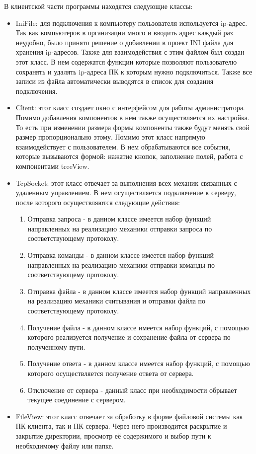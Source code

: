 В клиентской части программы находятся следующие классы:
\begin{itemize}
	\item IniFile: для подключения к компьютеру пользователя используется ip-адрес. Так как компьютеров в организации много и вводить адрес каждый раз неудобно, было принято решение о добавлении в проект INI файла для хранения ip-адресов. Также для взаимодействия с этим файлом был создан этот класс. В нем содержатся функции которые позволяют пользователю сохранять и удалять ip-адреса ПК к которым нужно подключиться. Также все записи из файла автоматически выводятся в список для создания подключения. 
	\item Client: этот класс создает окно с интерфейсом для работы администратора. Помимо добавления компонентов в нем также осуществляется их настройка. То есть при изменении размера формы компоненты также будут менять свой размер пропорционально этому. Помимо этот класс напрямую взаимодействует с пользователем. В нем обрабатываются все события, которые вызываются формой: нажатие кнопок, заполнение полей, работа с компонентами treeView. 
	\item TcpSocket: этот класс отвечает за выполнения всех механик связанных с удаленным управлением. В нем осуществляется подключение к серверу, после которого осуществляются следующие действия: 
	\begin{enumerate}
		\item Отправка запроса - в данном классе имеется набор функций направленных на реализацию механики отправки запроса по соответствующему протоколу.
		\item Отправка команды - в данном классе имеется набор функций направленных на реализацию механики отправки команды по соответствующему протоколу.
		\item Отправка файла - в данном классе имеется набор функций направленных на реализацию механики считывания и отправки файла по соответствующему протоколу.
		\item Получение файла - в данном классе имеется набор функций, с помощью которого реализуется получение и сохранение файла от сервера по полученному пути.
		\item Получение ответа - в данном классе имеется набор функций, с помощью которого осуществляется получение ответа от сервера.
		\item Отключение от сервера - данный класс при необходимости обрывает текущее соединение с сервером.
	\end{enumerate}
	\item FileView: этот класс отвечает за обработку в форме файловой системы как ПК клиента, так и ПК сервера. Через него производится раскрытие и закрытие директории, просмотр её содержимого и выбор пути к необходимому файлу или папке.
\end{itemize}

